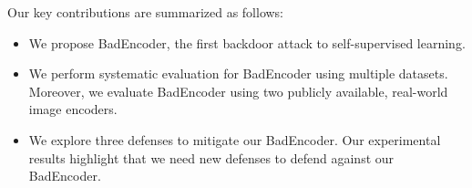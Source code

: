 Our key contributions are summarized as follows:
\begin{itemize}
    \item We propose BadEncoder, the first backdoor attack to  self-supervised learning.
    
    \item We perform systematic evaluation for BadEncoder using multiple datasets. Moreover, we evaluate BadEncoder using two publicly available, real-world image encoders. 
    
    \item We explore three defenses to mitigate our BadEncoder. Our experimental results highlight that we need new defenses to defend against our BadEncoder. 
\end{itemize}

